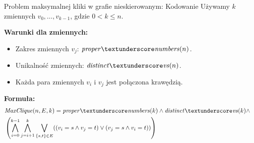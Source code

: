 \begin{frame}{Problem maksymalnej kliki w grafie nieskierowanym: Kodowanie}
Używamy $k$ zmiennych $v_0,…,v_{k−1}$, gdzie $0 < k \leq n$.
\vspace{10pt}
	
\textbf{Warunki dla zmiennych:}
\vspace{5pt}
\begin{itemize}
	\item Zakres zmiennych $v_j$: $\propernumbers(n)$.
	\item Unikalność zmiennych: $\distinctvs(n)$.
	\item Każda para zmiennych $v_i$ i	$v_j$ jest połączona krawędzią.	
\end{itemize}
\vspace{10pt}
	\textbf{Formuła:}
\begin{align*}
	&\MaxClique(n, E, k) = \propernumbers(k)  \land \distinctvs(k)  \land \\
	&\left( \bigwedge_{i=0}^{k-1} \bigwedge_{j=i+1}^{k} \bigvee_{\{s,t\} \in E} ((v_i = s \land v_j = t) \lor (v_j = s \land v_i = t)) \right)	
\end{align*}
\end{frame}
	